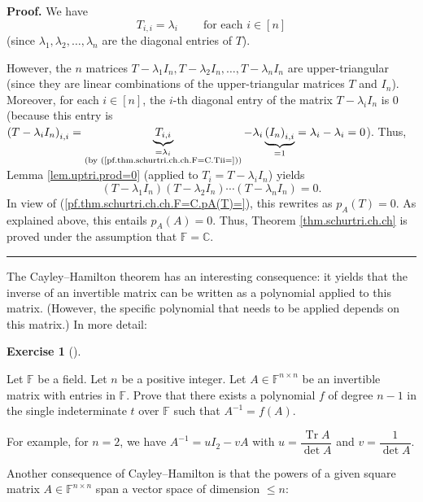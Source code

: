 \documentclass[numbers=enddot,12pt,final,onecolumn,notitlepage]{scrartcl}%
\newcounter{exer}
\numberwithin{exer}{subsection}
\theoremstyle{definition}
\newtheorem{exmp}[exer]{Exercise}
\newenvironment{exercise}[1][]
{\begin{exmp}[#1]\begin{leftbar}}
{\end{leftbar}\end{exmp}}
\newenvironment{proof}[1][Proof]{\noindent\textbf{#1.} }{\ \rule{0.5em}{0.5em}}
\begin{document}
\begin{proof}
We have%
\begin{equation}
T_{i,i}=\lambda_{i}\ \ \ \ \ \ \ \ \ \ \text{for each }i\in\left[  n\right]
\label{pf.thm.schurtri.ch.ch.F=C.Tii=}%
\end{equation}
(since $\lambda_{1},\lambda_{2},\ldots,\lambda_{n}$ are the diagonal entries
of $T$).

However, the $n$ matrices $T-\lambda_{1}I_{n},T-\lambda_{2}I_{n}%
,\ldots,T-\lambda_{n}I_{n}$ are upper-triangular (since they are linear
combinations of the upper-triangular matrices $T$ and $I_{n}$). Moreover, for
each $i\in\left[  n\right]  $, the $i$-th diagonal entry of the matrix
$T-\lambda_{i}I_{n}$ is $0$ (because this entry is $\left(  T-\lambda_{i}%
I_{n}\right)  _{i,i}=\underbrace{T_{i,i}}_{\substack{=\lambda_{i}\\\text{(by
(\ref{pf.thm.schurtri.ch.ch.F=C.Tii=}))}}}-\lambda_{i}\underbrace{\left(
I_{n}\right)  _{i,i}}_{=1}=\lambda_{i}-\lambda_{i}=0$). Thus, Lemma
\ref{lem.uptri.prod=0} (applied to $T_{i}=T-\lambda_{i}I_{n}$) yields%
\[
\left(  T-\lambda_{1}I_{n}\right)  \left(  T-\lambda_{2}I_{n}\right)
\cdots\left(  T-\lambda_{n}I_{n}\right)  =0.
\]
In view of (\ref{pf.thm.schurtri.ch.ch.F=C.pA(T)=}), this rewrites as
$p_{A}\left(  T\right)  =0$. As explained above, this entails $p_{A}\left(
A\right)  =0$. Thus, Theorem \ref{thm.schurtri.ch.ch} is proved under the
assumption that $\mathbb{F}=\mathbb{C}$.
\end{proof}

The Cayley--Hamilton theorem has an interesting consequence: it yields that
the inverse of an invertible matrix can be written as a polynomial applied to
this matrix. (However, the specific polynomial that needs to be applied
depends on this matrix.) In more detail:

\begin{exercise}
\label{exe.schurtri.ch.inverse-poly} Let $\mathbb{F}$ be a field. Let
$n$ be a positive integer. Let $A\in\mathbb{F}^{n\times n}$ be an invertible
matrix with entries in $\mathbb{F}$. Prove that there exists a polynomial $f$
of degree $n-1$ in the single indeterminate $t$ over $\mathbb{F}$ such that
$A^{-1}=f\left(  A\right)  $.
\end{exercise}

For example, for $n=2$, we have $A^{-1}=uI_{2}-vA$ with $u=\dfrac
{\operatorname*{Tr}A}{\det A}$ and $v=\dfrac{1}{\det A}$. \medskip

Another consequence of Cayley--Hamilton is that the powers of a given square
matrix $A\in\mathbb{F}^{n\times n}$ span a vector space of dimension $\leq n$:
\end{document}
